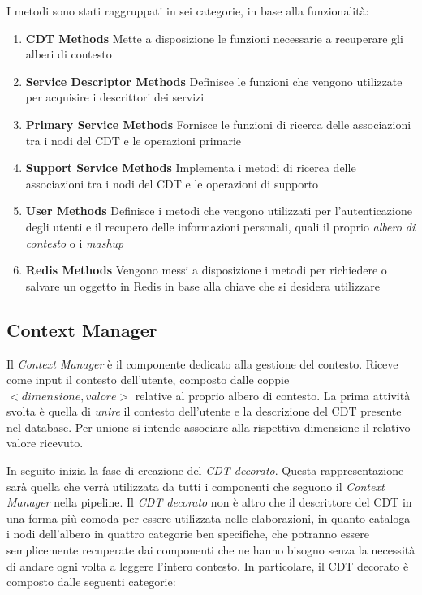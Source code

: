 I metodi sono stati raggruppati in sei categorie, in base alla funzionalità:

\begin{enumerate}
	\item \textbf{CDT Methods}
	Mette a disposizione le funzioni necessarie a recuperare gli alberi di contesto
	\item \textbf{Service Descriptor Methods}
	Definisce le funzioni che vengono utilizzate per acquisire i descrittori dei servizi
	\item \textbf{Primary Service Methods}
	Fornisce le funzioni di ricerca delle associazioni tra i nodi del CDT e le operazioni primarie
	\item \textbf{Support Service Methods}
	Implementa i metodi di ricerca delle associazioni tra i nodi del CDT e le operazioni di supporto
	\item \textbf{User Methods}
	Definisce i metodi che vengono utilizzati per l'autenticazione degli utenti e il recupero delle informazioni personali, quali il proprio \emph{albero di contesto} o i \emph{mashup}
	\item \textbf{Redis Methods}
	Vengono messi a disposizione i metodi per richiedere o salvare un oggetto in Redis in base alla chiave che si desidera utilizzare
\end{enumerate}

\subsection{Context Manager\label{sec:context-manager}}

Il \emph{Context Manager} è il componente dedicato alla gestione del contesto. Riceve come input il contesto dell'utente, composto dalle coppie $ {<}dimensione, valore{>} $ relative al proprio albero di contesto. La prima attività svolta è quella di \emph{unire} il contesto dell'utente e la descrizione del CDT presente nel database. Per unione si intende associare alla rispettiva dimensione il relativo valore ricevuto.

In seguito inizia la fase di creazione del \emph{CDT decorato}. Questa rappresentazione sarà quella che verrà utilizzata da tutti i componenti che seguono il \emph{Context Manager} nella pipeline. Il \emph{CDT decorato} non è altro che il descrittore del CDT in una forma più comoda per essere utilizzata nelle elaborazioni, in quanto cataloga i nodi dell'albero in quattro categorie ben specifiche, che potranno essere semplicemente recuperate dai componenti che ne hanno bisogno senza la necessità di andare ogni volta a leggere l'intero contesto. In particolare, il CDT decorato è composto dalle seguenti categorie:

